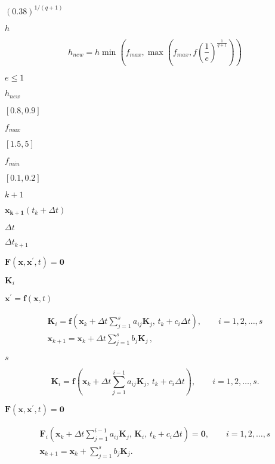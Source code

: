 \documentclass{article}
\begin{document}
$ (0.38)^{1/(q+1)} $
\pagebreak

$ h $
\pagebreak

\[
h_{new} = h \min\left(f_{max}, \max\left(f_{max}, f \left(\dfrac{1}{e}\right)^{\frac{1}{q+1}}
\right) \right)
\]
\pagebreak

$ e \leq 1 $
\pagebreak

$ h_{new} $
\pagebreak

$ [0.8, 0.9] $
\pagebreak

$ f_{max} $
\pagebreak

$ [1.5, 5] $
\pagebreak

$ f_{min} $
\pagebreak

$ [0.1, 0.2] $
\pagebreak

$ k+1 $
\pagebreak

$
           \mathbf{x_{k+1}}(t_{k}+\Delta t) $
\pagebreak

$ \Delta t$
\pagebreak

$ \Delta
        t_{k+1} $
\pagebreak

$ \mathbf{F}(\mathbf{x}, \mathbf{x}^{\prime}, t)
= \mathbf{0} $
\pagebreak

$ \mathbf{K}_i $
\pagebreak

$ \mathbf{x}^{\prime} = \mathbf{f}(\mathbf{x}, t) $
\pagebreak

\[
\begin{array}{l}
\mathbf{K}_i = \mathbf{f} \left(
  \mathbf{x}_k + \Delta t \displaystyle\sum_{j=1}^{s} a_{ij} \mathbf{K}_j,
  \, t_k + c_i \Delta t
  \right), \qquad i = 1, 2, \ldots, s \\
\mathbf{x}_{k+1} = \mathbf{x}_k + \Delta t \displaystyle\sum_{j=1}^s b_j
\mathbf{K}_j \, ,
\end{array}
\]
\pagebreak

$ s$
\pagebreak

\[
\mathbf{K}_i = \mathbf{f} \left(
  \mathbf{x}_k + \Delta t \displaystyle\sum_{j=1}^{i-1} a_{ij}
  \mathbf{K}_j, \, t_k + c_i \Delta t
  \right), \qquad i = 1, 2, \ldots, s.
\]
\pagebreak

$\mathbf{F}(\mathbf{x}, \mathbf{x}^{\prime}, t) = \mathbf{0} $
\pagebreak

\[
\begin{array}{l}
\mathbf{F}_i \left(
  \mathbf{x}_k + \Delta t \displaystyle\sum_{j=1}^{i-1} a_{ij}
    \mathbf{K}_j, \, \mathbf{K}_i, \, t_k + c_i \Delta t
\right) = \mathbf{0}, \qquad i = 1, 2, \ldots, s \\
\mathbf{x}_{k+1} = \mathbf{x}_k + \displaystyle\sum_{j=1}^s b_j \mathbf{K}_j.
\end{array}
\]
\pagebreak
\end{document}
